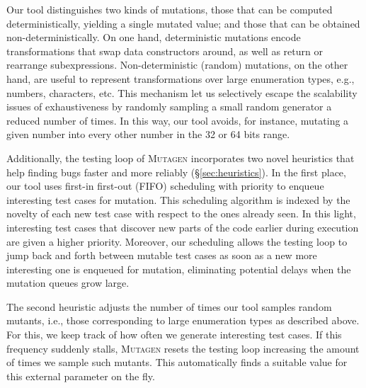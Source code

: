 \documentclass[sigconf, anonymous, review]{acmart}
\newcommand{\mutagen}{\textsc{Mutagen}\xspace}
\begin{document}
%
Our tool distinguishes two kinds of mutations, those that can be computed
deterministically, yielding a single mutated value; and those that can be
obtained non-deterministically.
%
On one hand, deterministic mutations encode transformations that swap data
constructors around, as well as return or rearrange subexpressions.
%
Non-deterministic (random) mutations, on the other hand, are useful to represent
transformations over large enumeration types, e.g., numbers, characters, etc.
%
This mechanism let us selectively escape the scalability issues of
exhaustiveness by randomly sampling a small random generator a reduced number of
times.
%
In this way, our tool avoids, for instance, mutating a given number into every
other number in the 32 or 64 bits range.


Additionally, the testing loop of \mutagen incorporates two novel heuristics
that help finding bugs faster and more reliably (\S \ref{sec:heuristics}).
%
In the first place, our tool uses first-in first-out (FIFO) scheduling with
priority to enqueue interesting test cases for mutation.
%
This scheduling algorithm is indexed by the novelty of each new test case with
respect to the ones already seen.
%
In this light, interesting test cases that discover new parts of the code
earlier during execution are given a higher priority.
%
Moreover, our scheduling allows the testing loop to jump back and forth between
mutable test cases as soon as a new more interesting one is enqueued for
mutation, eliminating potential delays when the mutation queues grow large.


The second heuristic adjusts the number of times our tool samples random
mutants, i.e., those corresponding to large enumeration types as described
above.
%
For this, we keep track of how often we generate interesting test cases.
%
If this frequency suddenly stalls, \mutagen resets the testing loop increasing
the amount of times we sample such mutants.
%
This automatically finds a suitable value for this external parameter on the
fly.
\end{document}
